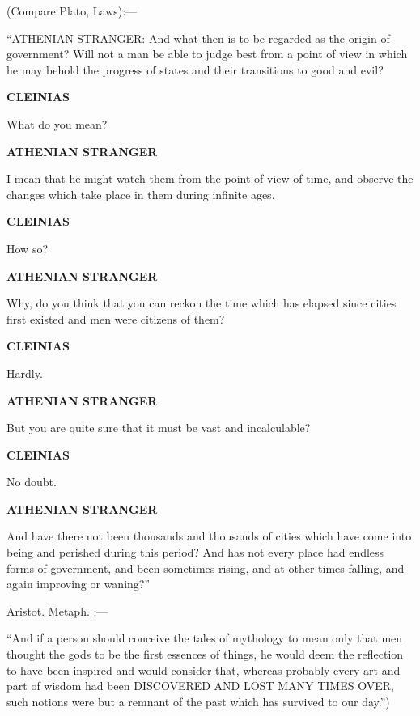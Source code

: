 \documentclass[11pt,letter]{article}
\begin{document}
\par  (Compare Plato, Laws):—

\par  “ATHENIAN STRANGER: And what then is to be regarded as the origin of government? Will not a man be able to judge best from a point of view in which he may behold the progress of states and their transitions to good and evil?

\par \textbf{CLEINIAS}
\par   What do you mean?

\par \textbf{ATHENIAN STRANGER}
\par   I mean that he might watch them from the point of view of time, and observe the changes which take place in them during infinite ages.

\par \textbf{CLEINIAS}
\par   How so?

\par \textbf{ATHENIAN STRANGER}
\par   Why, do you think that you can reckon the time which has elapsed since cities first existed and men were citizens of them?

\par \textbf{CLEINIAS}
\par   Hardly.

\par \textbf{ATHENIAN STRANGER}
\par   But you are quite sure that it must be vast and incalculable?

\par \textbf{CLEINIAS}
\par   No doubt.

\par \textbf{ATHENIAN STRANGER}
\par   And have there not been thousands and thousands of cities which have come into being and perished during this period? And has not every place had endless forms of government, and been sometimes rising, and at other times falling, and again improving or waning?”

\par  Aristot. Metaph. :—

\par  “And if a person should conceive the tales of mythology to mean only that men thought the gods to be the first essences of things, he would deem the reflection to have been inspired and would consider that, whereas probably every art and part of wisdom had been DISCOVERED AND LOST MANY TIMES OVER, such notions were but a remnant of the past which has survived to our day.”)
\end{document}
